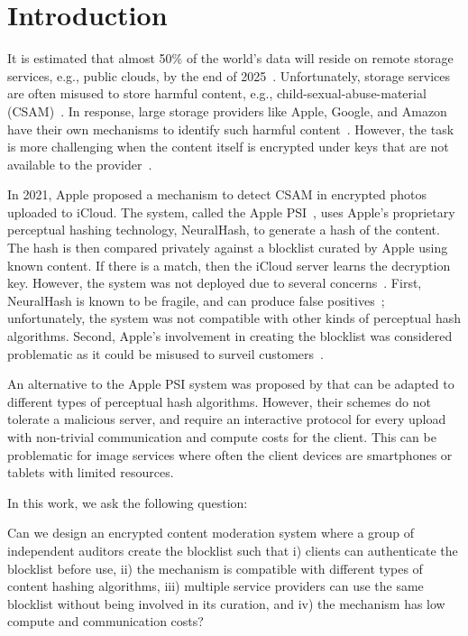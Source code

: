 \section{Introduction}
%



It is estimated that almost 50\% of the world's data will reside on
remote storage services, e.g., public clouds, by the end of 2025~\cite{public_storage_vol}.
Unfortunately, storage services are often misused to store harmful
content, e.g., child-sexual-abuse-material (CSAM)~\cite{williams2022csam}. In response,
large storage providers like Apple, Google, and Amazon have their own
mechanisms to identify such harmful content~\cite{apple2021csam,
  googleCSAM, amazonCSAM}. However, the task is more challenging
when the content itself is encrypted under keys that are not available 
to the provider~\cite{content_mod_e2ee}. 

In 2021, Apple proposed a mechanism to detect CSAM in encrypted photos
uploaded to iCloud. The system, called the Apple
PSI~\cite{bhowmick2021apple}, uses Apple's proprietary perceptual
hashing technology, NeuralHash, to generate a hash of the
content. The hash is then compared privately against a blocklist curated by Apple using known content. 
If there is a match, then the iCloud server learns the decryption key. However, 
the system was not deployed due to several concerns~\cite{applePSIabandon}. 
First, NeuralHash is known to be fragile, and can
produce false positives~\cite{neuralHashAttack}; unfortunately, the system was not compatible 
with other kinds of perceptual hash algorithms. 
Second, Apple's involvement in creating the
blocklist was considered problematic as it could be misused to
surveil customers~\cite{applePSICriticBBC,
  applePSICriticBU}. 

An alternative to the Apple PSI system was proposed by \citet{kulshrestha2021identifying} that 
can be adapted to different types of perceptual hash algorithms. However, their schemes do not tolerate a 
malicious server, and require an interactive protocol for every upload 
with non-trivial communication and compute costs for the client. 
This can be problematic for image services where often the client devices are smartphones or tablets with limited resources.



In this work, we ask the following question: 

\begin{myquote}
Can we design an encrypted content moderation system where a group of independent auditors create 
the blocklist such that i) clients can authenticate the blocklist before use, ii) the mechanism is compatible with different types of content hashing algorithms, iii) multiple service providers can use the same blocklist without being involved in its curation, and iv) the mechanism has low compute and communication costs?
\end{myquote}


